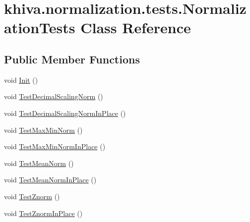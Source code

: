 \hypertarget{classkhiva_1_1normalization_1_1tests_1_1_normalization_tests}{}\section{khiva.\+normalization.\+tests.\+Normalization\+Tests Class Reference}
\label{classkhiva_1_1normalization_1_1tests_1_1_normalization_tests}
\subsection*{Public Member Functions}
\begin{DoxyCompactItemize}
\item 
void \mbox{\hyperlink{classkhiva_1_1normalization_1_1tests_1_1_normalization_tests_abd6916db57bdb9513e17c8384d87d5a2}{Init}} ()
\item 
void \mbox{\hyperlink{classkhiva_1_1normalization_1_1tests_1_1_normalization_tests_a91485de46151e488526f823e592670df}{Test\+Decimal\+Scaling\+Norm}} ()
\item 
void \mbox{\hyperlink{classkhiva_1_1normalization_1_1tests_1_1_normalization_tests_aee69aa5a84c32252b3d6f3db97ae2ad4}{Test\+Decimal\+Scaling\+Norm\+In\+Place}} ()
\item 
void \mbox{\hyperlink{classkhiva_1_1normalization_1_1tests_1_1_normalization_tests_a044041b255a1e5684727a9c5beaf37d1}{Test\+Max\+Min\+Norm}} ()
\item 
void \mbox{\hyperlink{classkhiva_1_1normalization_1_1tests_1_1_normalization_tests_afa0d94578ead23d17173795e2e1e8c9c}{Test\+Max\+Min\+Norm\+In\+Place}} ()
\item 
void \mbox{\hyperlink{classkhiva_1_1normalization_1_1tests_1_1_normalization_tests_a72ade016c9c7727062b6dcd8c64dcefd}{Test\+Mean\+Norm}} ()
\item 
void \mbox{\hyperlink{classkhiva_1_1normalization_1_1tests_1_1_normalization_tests_a17f9be6ee33f5e8b0175e1d65f406ef4}{Test\+Mean\+Norm\+In\+Place}} ()
\item 
void \mbox{\hyperlink{classkhiva_1_1normalization_1_1tests_1_1_normalization_tests_a6a9dac9f8ab27810bcefe71cf12b0adc}{Test\+Znorm}} ()
\item 
void \mbox{\hyperlink{classkhiva_1_1normalization_1_1tests_1_1_normalization_tests_a63dd8cfff79eb91053d9bf45990f691c}{Test\+Znorm\+In\+Place}} ()
\end{DoxyCompactItemize}


